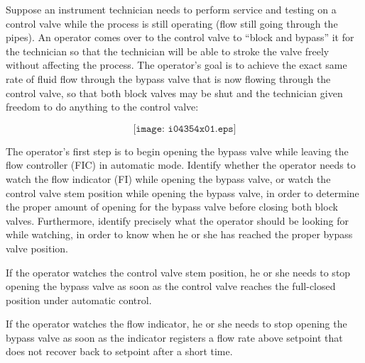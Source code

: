 

Suppose an instrument technician needs to perform service and testing on a control valve while the process is still operating (flow still going through the pipes).  An operator comes over to the control valve to ``block and bypass'' it for the technician so that the technician will be able to stroke the valve freely without affecting the process.  The operator's goal is to achieve the exact same rate of fluid flow through the bypass valve that is now flowing through the control valve, so that both block valves may be shut and the technician given freedom to do anything to the control valve:

$$\texttt{[image: i04354x01.eps]}$$

The operator's first step is to begin opening the bypass valve while leaving the flow controller (FIC) in automatic mode.  Identify whether the operator needs to watch the flow indicator (FI) while opening the bypass valve, or watch the control valve stem position while opening the bypass valve, in order to determine the proper amount of opening for the bypass valve before closing both block valves.  Furthermore, identify precisely what the operator should be looking for while watching, in order to know when he or she has reached the proper bypass valve position.







If the operator watches the control valve stem position, he or she needs to stop opening the bypass valve as soon as the control valve reaches the full-closed position under automatic control.

\vskip 10pt

If the operator watches the flow indicator, he or she needs to stop opening the bypass valve as soon as the indicator registers a flow rate above setpoint that does not recover back to setpoint after a short time.











